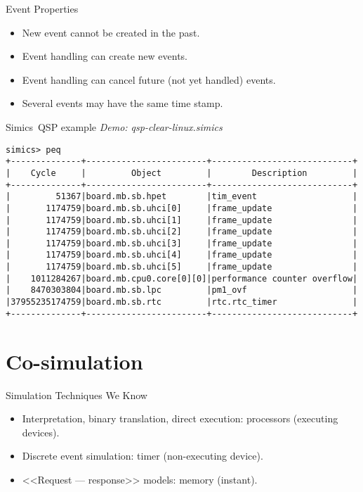 \begin{frame}{Event Properties}
\begin{itemize}
\item New event cannot be created in the past.
\item Event handling can create new events.
\item Event handling can cancel future (not yet handled) events.
\item Several events may have the same time stamp.
\end{itemize}
\end{frame}

\begin{frame}[fragile]{Simics\reg~QSP example}
\emph{Demo: qsp-clear-linux.simics}
\footnotesize{\begin{verbatim}
simics> peq
+--------------+------------------------+----------------------------+
|    Cycle     |         Object         |        Description         |
+--------------+------------------------+----------------------------+
|         51367|board.mb.sb.hpet        |tim_event                   |
|       1174759|board.mb.sb.uhci[0]     |frame_update                |
|       1174759|board.mb.sb.uhci[1]     |frame_update                |
|       1174759|board.mb.sb.uhci[2]     |frame_update                |
|       1174759|board.mb.sb.uhci[3]     |frame_update                |
|       1174759|board.mb.sb.uhci[4]     |frame_update                |
|       1174759|board.mb.sb.uhci[5]     |frame_update                |
|    1011284267|board.mb.cpu0.core[0][0]|performance counter overflow|
|    8470303804|board.mb.sb.lpc         |pm1_ovf                     |
|37955235174759|board.mb.sb.rtc         |rtc.rtc_timer               |
+--------------+------------------------+----------------------------+
\end{verbatim}}
\end{frame}

\section{Co-simulation}

\begin{frame}{Simulation Techniques We Know}
\begin{itemize}
  \item Interpretation, binary translation, direct execution\pause:
    processors (executing devices).\pause
  \item Discrete event simulation\pause: timer (non-executing device).\pause
  \item{<<Request --- response>> models\pause: memory (instant).}
\end{itemize}
\end{frame}

